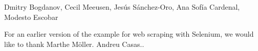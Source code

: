 Dmitry Bogdanov, Cecil Meeusen, Jesús Sánchez-Oro, Ana Sofía Cardenal, Modesto Escobar

For an earlier version of the example for web scraping with Selenium, we would like to thank Marthe Möller.
Andreu Casas..
